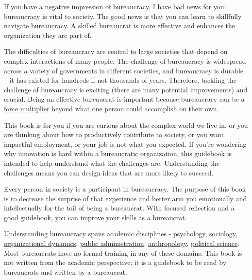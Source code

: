 

If you have a negative impression of bureaucracy, I have bad news for you: bureaucracy is vital to society. The good news is that you can learn to skillfully navigate bureaucracy. A skilled bureaucrat is more effective and enhances the organization they are part of.

The difficulties of bureaucracy are central  to large societies that depend on complex interactions of many people. The challenge of bureaucracy is widespread across a variety of governments in different societies, and bureaucracy is durable -- it has existed for hundreds if not thousands of years. Therefore, tackling the challenge of bureaucracy is exciting (there are many potential improvements) and crucial. 
Being an effective bureaucrat is important because bureaucracy can be a \href{https://en.wikipedia.org/wiki/Force_multiplication}{force multiplier} beyond what one person could accomplish on their own.

This book is for you if you are curious about the complex world we live in, or you are thinking about how to productively contribute to society, or you want impactful employment, or your job is not what you expected. If you're wondering why innovation is hard within a bureaucratic organization, this guidebook is intended to help understand what the challenges are. Understanding the challenges means you can design ideas that are more likely to succeed.


Every person in society is a participant in bureaucracy. The purpose of this book is to decrease the surprise of that experience and better arm you emotionally and intellectually for the toil of being a bureaucrat. With focused reflection and a good guidebook, you can improve your skills as a bureaucrat. 

Understanding bureaucracy spans academic disciplines - \href{https://en.wikipedia.org/wiki/Psychology}{psychology}, \href{https://en.wikipedia.org/wiki/Sociology}{sociology}, \href{https://en.wikipedia.org/wiki/Organizational_behavior}{organizational dynamics}, \href{https://en.wikipedia.org/wiki/Public_administration}{public administration}, \href{https://en.wikipedia.org/wiki/Anthropology}{anthropology}, \href{https://en.wikipedia.org/wiki/Political_science}{political science}. Most bureaucrats have no formal training in any of these domains. This book is not written from the academic perspective; it is a guidebook to be read by bureaucrats and written by a bureaucrat. 

